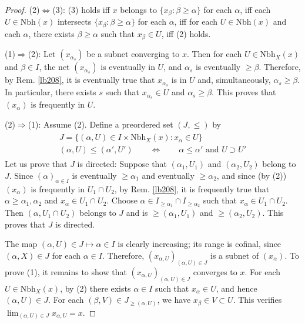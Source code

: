 \documentclass[12pt,b5paper,notitlepage]{article}
\theoremstyle{definition}
\theoremstyle{plain}
\newcommand{\ovl}{\overline}
\newcommand{\Nbh}{\mathrm{Nbh}}
\numberwithin{equation}{section}
\begin{document}
\begin{proof}
(2)$\Leftrightarrow$(3): (3) holds iff $x$ belongs to $\ovl{\{x_\beta:\beta\geq\alpha\}}$ for each $\alpha$, iff each $U\in\Nbh(x)$ intersects $\{x_\beta:\beta\geq\alpha\}$ for each $\alpha$, iff for each $U\in\Nbh(x)$ and each $\alpha$, there exists $\beta\geq\alpha$ such that $x_\beta\in U$, iff (2) holds.

(1)$\Rightarrow$(2): Let $(x_{\alpha_s})$ be a subnet converging to $x$. Then for each $U\in\Nbh_X(x)$ and $\beta\in I$, the net $(x_{\alpha_s})$ is eventually in $U$, and $\alpha_s$ is eventually $\geq\beta$. Therefore, by Rem. \ref{lb208}, it is eventually true that $x_{\alpha_s}$ is in $U$ and, simultaneously,  $\alpha_s\geq\beta$. In particular, there exists $s$ such that $x_{\alpha_s}\in U$ and $\alpha_s\geq\beta$. This proves that $(x_\alpha)$ is frequently in $U$.

(2)$\Rightarrow$(1): Assume (2). Define a preordered set $(J,\leq)$ by
\begin{gather}
\begin{gathered}
J=\{(\alpha,U)\in I\times\Nbh_X(x):x_\alpha\in U \}\\[0.5ex]
(\alpha,U)\leq (\alpha',U')\qquad\Longleftrightarrow\qquad \alpha\leq \alpha'\text{ and }U\supset U'
\end{gathered}
\end{gather}
Let us prove that $J$ is directed: Suppose that $(\alpha_1,U_1)$ and $(\alpha_2,U_2)$ belong to $J$. Since $(\alpha)_{\alpha\in I}$ is eventually $\geq\alpha_1$ and eventually $\geq\alpha_2$, and since (by (2)) $(x_\alpha)$ is frequently in $U_1\cap U_2$, by Rem. \ref{lb208}, it is frequently true that $\alpha\geq\alpha_1,\alpha_2$ and $x_\alpha\in U_1\cap U_2$. Choose $\alpha\in I_{\geq\alpha_1}\cap I_{\geq\alpha_2}$ such that $x_\alpha\in U_1\cap U_2$. Then $(\alpha,U_1\cap U_2)$ belongs to $J$ and is $\geq(\alpha_1,U_1)$ and $\geq(\alpha_2,U_2)$. This proves that $J$ is directed.


The map $(\alpha,U)\in J\mapsto \alpha\in I$ is clearly increasing; its range is cofinal, since $(\alpha,X)\in J$ for each $\alpha\in I$. Therefore, $(x_{\alpha,U})_{(\alpha,U)\in J}$ is a subnet of $(x_\alpha)$. To prove (1), it remains to show that $(x_{\alpha,U})_{(\alpha,U)\in J}$ converges to $x$. For each $U\in\Nbh_X(x)$, by (2) there exists $\alpha\in I$ such that $x_\alpha\in U$, and hence $(\alpha,U)\in J$. For each $(\beta,V)\in J_{\geq(\alpha,U)}$, we have $x_\beta\in V\subset U$. This verifies $\lim_{(\alpha,U)\in J}x_{\alpha,U}=x$.
\end{proof}
\end{document}
